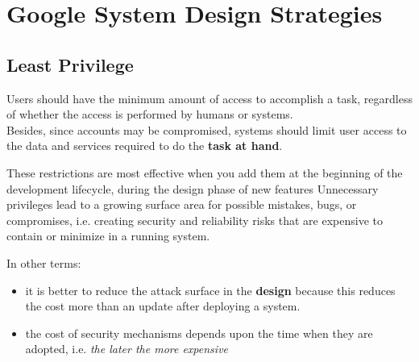 \chapter{Google System Design Strategies}

\section{Least Privilege}
Users should have the minimum amount of access to accomplish a task,
regardless of whether the access is performed by humans or systems.\\
Besides, since accounts may be compromised, systems should limit user access to the data and services required to do the \textbf{task at hand}.

These restrictions are most effective when you add them at the beginning of the development lifecycle,
during the design phase of new features
Unnecessary privileges lead to a growing surface area for possible mistakes, bugs, or compromises, i.e. creating security and reliability risks that are expensive to contain or minimize in a running system.

In other terms:
\begin{itemize}
   \item it is better to reduce the attack surface in the \textbf{design} because this
   reduces the cost more than an update after deploying a system.
   \item the cost of security mechanisms depends upon the time when they
   are adopted, i.e. \textit{the later the more expensive}
\end{itemize}



